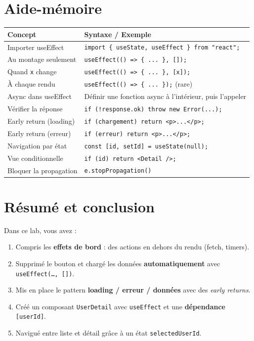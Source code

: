\documentclass[11pt,a4paper]{article}
\begin{document}
\section{Aide-mémoire}

\begin{center}
\begin{tabular}{lp{8cm}}
\toprule
\textbf{Concept} & \textbf{Syntaxe / Exemple} \\
\midrule
Importer useEffect & \texttt{import \{ useState, useEffect \} from "react";} \\
Au montage seulement & \texttt{useEffect(() => \{ ... \}, []);} \\
Quand \texttt{x} change & \texttt{useEffect(() => \{ ... \}, [x]);} \\
À chaque rendu & \texttt{useEffect(() => \{ ... \});} (rare) \\
\midrule
Async dans useEffect & Définir une fonction async à l'intérieur, puis l'appeler \\
Vérifier la réponse & \texttt{if (!response.ok) throw new Error(...);} \\
\midrule
Early return (loading) & \texttt{if (chargement) return <p>...</p>;} \\
Early return (erreur) & \texttt{if (erreur) return <p>...</p>;} \\
\midrule
Navigation par état & \texttt{const [id, setId] = useState(null);} \\
Vue conditionnelle & \texttt{if (id) return <Detail />;} \\
Bloquer la propagation & \texttt{e.stopPropagation()} \\
\bottomrule
\end{tabular}
\end{center}

\newpage

\section{Résumé et conclusion}

Dans ce lab, vous avez :
\begin{enumerate}[nosep]
\item Compris les \textbf{effets de bord} : des actions en dehors du rendu (fetch, timers).
\item Supprimé le bouton et chargé les données \textbf{automatiquement} avec \texttt{useEffect(\ldots, [])}.
\item Mis en place le pattern \textbf{loading / erreur / données} avec des \emph{early returns}.
\item Créé un composant \texttt{UserDetail} avec \texttt{useEffect} et une \textbf{dépendance} \texttt{[userId]}.
\item Navigué entre liste et détail grâce à un état \texttt{selectedUserId}.
\end{enumerate}
\end{document}
